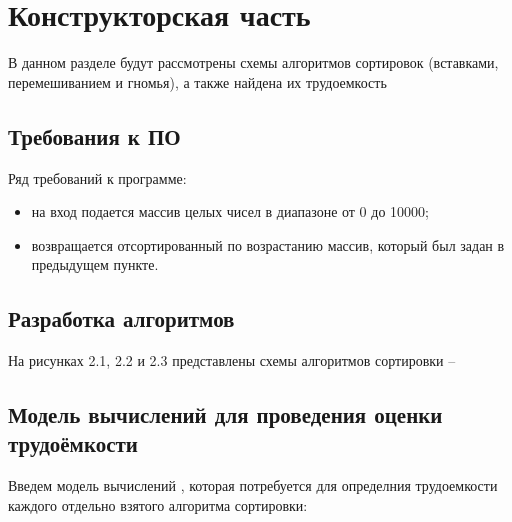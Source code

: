 \chapter{Конструкторская часть}
В данном разделе будут рассмотрены схемы алгоритмов сортировок (вставками, перемешиванием и гномья), а также найдена их трудоемкость

\section{Требования к ПО}
Ряд требований к программе:
\begin{itemize}
	\item на вход подается массив целых чисел в диапазоне от 0 до 10000;
    \item возвращается отсортированный по возрастанию массив, который был задан в предыдущем пункте. \newline
\end{itemize}

\section{Разработка алгоритмов}
На рисунках 2.1, 2.2 и 2.3 представлены схемы алгоритмов сортировки --

\clearpage

\section{Модель вычислений для проведения оценки трудоёмкости}
Введем модель вычислений \cite{model}, которая потребуется для определния трудоемкости каждого отдельно взятого алгоритма сортировки:

